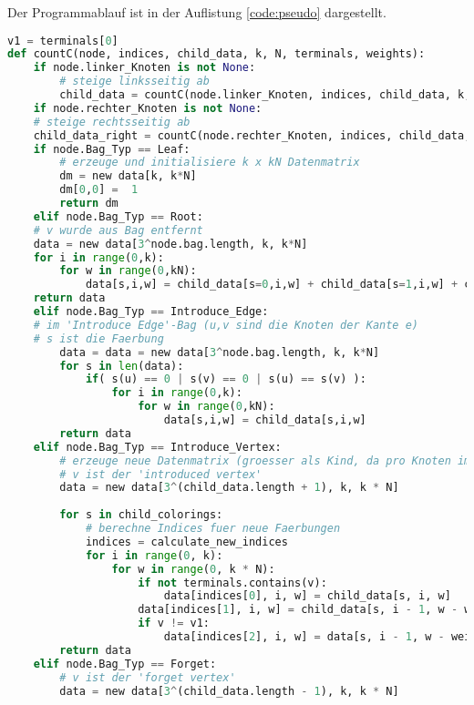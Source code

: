 Der Programmablauf ist in der Auflistung \ref{code:pseudo} dargestellt.

\begin{svgraybox}
\begin{lstlisting}[language=python,label={code:pseudo}, caption=Pseudocode für das dynamische Programm]
v1 = terminals[0]
def countC(node, indices, child_data, k, N, terminals, weights):
    if node.linker_Knoten is not None:
        # steige linksseitig ab
        child_data = countC(node.linker_Knoten, indices, child_data, k, N, terminals, weights)
    if node.rechter_Knoten is not None:
	# steige rechtsseitig ab
	child_data_right = countC(node.rechter_Knoten, indices, child_data, k, N, terminals, weights)
    if node.Bag_Typ == Leaf:
    	# erzeuge und initialisiere k x kN Datenmatrix
    	dm = new data[k, k*N]
    	dm[0,0] =  1
    	return dm
    elif node.Bag_Typ == Root:
	# v wurde aus Bag entfernt
	data = new data[3^node.bag.length, k, k*N]
	for i in range(0,k):
		for w in range(0,kN):
			data[s,i,w] = child_data[s=0,i,w] + child_data[s=1,i,w] + child_data[s=2,i,w]
	return data			
    elif node.Bag_Typ == Introduce_Edge:
	# im 'Introduce Edge'-Bag (u,v sind die Knoten der Kante e)
	# s ist die Faerbung
		data = data = new data[3^node.bag.length, k, k*N]
		for s in len(data):
			if( s(u) == 0 | s(v) == 0 | s(u) == s(v) ):
				for i in range(0,k):
					for w in range(0,kN):
						data[s,i,w] = child_data[s,i,w]
        return data
    elif node.Bag_Typ == Introduce_Vertex:
        # erzeuge neue Datenmatrix (groesser als Kind, da pro Knoten im Bag drei neue Faerbungen)
        # v ist der 'introduced vertex' 
        data = new data[3^(child_data.length + 1), k, k * N]
        
        for s in child_colorings:
        	# berechne Indices fuer neue Faerbungen
        	indices = calculate_new_indices
            for i in range(0, k):
                for w in range(0, k * N):
                    if not terminals.contains(v):
                        data[indices[0], i, w] = child_data[s, i, w]
                    data[indices[1], i, w] = child_data[s, i - 1, w - weights(v)]
                    if v != v1:
                        data[indices[2], i, w] = data[s, i - 1, w - weights.get(introduced_vertex)]
        return data
    elif node.Bag_Typ == Forget:
    	# v ist der 'forget vertex'
        data = new data[3^(child_data.length - 1), k, k * N]
		

\end{lstlisting}
\end{svgraybox}
